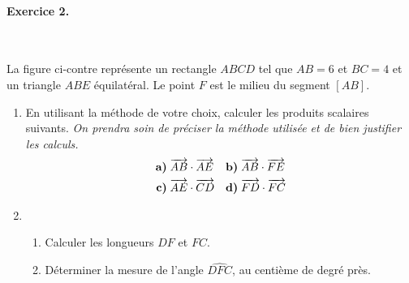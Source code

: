\documentclass[11pt]{article}
\begin{document}
\paragraph{Exercice 2.}~\\
\begin{minipage}{.6\textwidth}
  La figure ci-contre représente un rectangle $ABCD$ tel que $AB=6$ et $BC=4$ et
  un triangle $ABE$ équilatéral. Le point $F$ est le milieu du segment $\left[
  AB \right]$.
  \begin{enumerate}
    \item En utilisant la méthode de votre choix, calculer les produits
      scalaires suivants. \emph{On prendra soin de préciser la méthode utilisée
      et de bien justifier les calculs.}
      \begin{align*}
        \textbf{a)}\;& \overrightarrow{AB}\cdot\overrightarrow{AE} &
        \textbf{b)}\;& \overrightarrow{AB}\cdot\overrightarrow{FE} \\
        \textbf{c)}\;& \overrightarrow{AE}\cdot\overrightarrow{CD} &
        \textbf{d)}\;& \overrightarrow{FD}\cdot\overrightarrow{FC}
      \end{align*}
    \item \begin{enumerate}
        \item Calculer les longueurs $DF$ et $FC$.
        \item Déterminer la mesure de l'angle $\widehat{DFC}$, au centième de
          degré près.
      \end{enumerate}
  \end{enumerate}
\end{minipage}
\begin{minipage}{.4\textwidth}
\begin{center}
\end{center}
\end{minipage}
\end{document}
